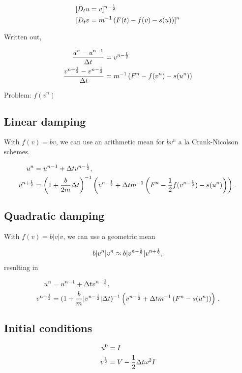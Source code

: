 \documentclass[%
oneside,                 %
final,                   %
10pt]{article}
\begin{document}
\noindent
\begin{align*}
\lbrack D_t u &= v\rbrack^{n-\half}
\\ 
\lbrack D_tv &= m^{-1}\left(F(t) - f(v) - s(u)\right)\rbrack^n
\end{align*}

Written out,

\begin{align*}
\frac{u^n - u^{n-1}}{\Delta t} &= v^{n-\half}\\ 
\frac{v^{n+\half} - v^{n-\half}}{\Delta t}
&= m^{-1}\left(F^n - f(v^n) - s(u^n)\right)
\end{align*}

Problem: $f(v^n)$

\subsection*{Linear damping}

With $f(v)=bv$, we can use an arithmetic mean for $bv^n$ a la
Crank-Nicolson schemes.

\begin{align*}
u^n & = u^{n-1} + {\Delta t}v^{n-\half},\\ 
v^{n+\half} &= \left(1 + \frac{b}{2m}\Delta t\right)^{-1}\left(
v^{n-\half} + {\Delta t}
m^{-1}\left(F^n - {\half}f(v^{n-\half}) - s(u^n)\right)\right)\tp
\end{align*}

\subsection*{Quadratic damping}

With $f(v)=b|v|v$, we can use a geometric mean

\[
b|v^n|v^n\approx b|v^{n-\half}|v^{n+\half},
\]
resulting in

\begin{align*}
u^n & = u^{n-1} + {\Delta t}v^{n-\half},\\ 
v^{n+\half} &= (1 + \frac{b}{m}|v^{n-\half}|\Delta t)^{-1}\left(
v^{n-\half} + {\Delta t}
m^{-1}\left(F^n - s(u^n)\right)\right)\tp
\end{align*}

\subsection*{Initial conditions}

\begin{align*}
u^0 &= I\\ 
v^{\half} &= V - \half\Delta t\omega^2I
\end{align*}


\cleardoublepage{}  %
\printindex
\end{document}
